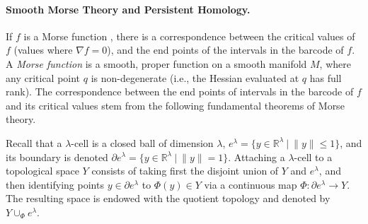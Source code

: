 \documentclass[11pt]{article}
\newcommand{\R}{\mathbb{R}}
\newcommand{\bord}{\partial}
\newcommand{\union}{\cup}
\theoremstyle{plain}
\theoremstyle{definition}
\theoremstyle{remark}
\begin{document}
\paragraph{Smooth Morse Theory and Persistent Homology.}
If $f$ is a Morse function \citep{milnor_morse_1963}, there is a correspondence between the critical values of $f$ (values where $\nabla f = 0$), and the end points of the intervals in the barcode of $f$. A \textit{Morse function} is a smooth, proper function on a smooth manifold $M$, where any critical point $q$ is non-degenerate (i.e., the Hessian evaluated at $q$ has full rank). The correspondence between the end points of intervals in the barcode of $f$ and its critical values stem from the following fundamental theorems of Morse theory.


Recall that a $\lambda$-cell is a closed ball of dimension $\lambda$,
$e^\lambda = \{y \in \R^\lambda ~|~ \|y\| \leq 1 \}$,
and its boundary is denoted $\bord e^\lambda = \{y \in \R^\lambda ~|~ \|y\| = 1 \}$.
Attaching a $\lambda$-cell to a topological space $Y$ consists of taking first the disjoint union of $Y$ and $e^\lambda$, and then identifying points $y \in \bord e^\lambda$ to $\Phi(y) \in Y$ via a continuous map $\Phi : \bord e^\lambda \to Y$. The resulting space is endowed with the quotient topology and denoted by $Y \union_\Phi e^\lambda$.
\end{document}
